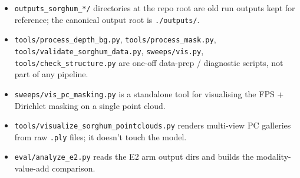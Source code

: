 \documentclass[
  10pt,
]{article}
\providecommand{\tightlist}{%
  \setlength{\itemsep}{0pt}\setlength{\parskip}{0pt}}
\begin{document}
\begin{itemize}
\tightlist
\item
  \texttt{outputs\_sorghum\_*/} directories at the repo root are old run
  outputs kept for reference; the canonical output root is
  \texttt{./outputs/}.
\item
  \texttt{tools/process\_depth\_bg.py}, \texttt{tools/process\_mask.py},
  \texttt{tools/validate\_sorghum\_data.py}, \texttt{sweeps/vis.py},
  \texttt{tools/check\_structure.py} are one-off data-prep / diagnostic
  scripts, not part of any pipeline.
\item
  \texttt{sweeps/vis\_pc\_masking.py} is a standalone tool for
  visualising the FPS + Dirichlet masking on a single point cloud.
\item
  \texttt{tools/visualize\_sorghum\_pointclouds.py} renders multi-view
  PC galleries from raw \texttt{.ply} files; it doesn't touch the model.
\item
  \texttt{eval/analyze\_e2.py} reads the E2 arm output dirs and builds
  the modality-value-add comparison.
\end{itemize}
\end{document}
